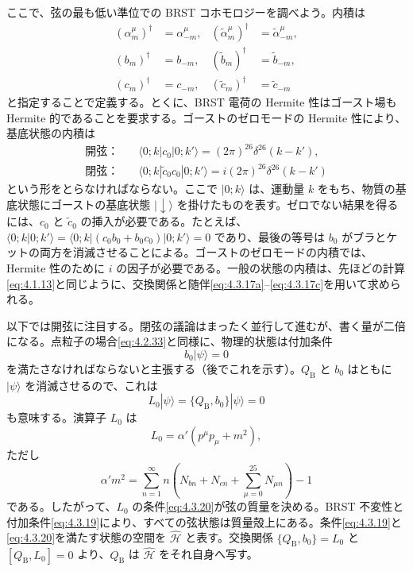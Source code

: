 
ここで、弦の最も低い準位での BRST コホモロジーを調べよう。内積は
\begin{align}
(\alpha^\mu_m)^\dagger&=\alpha^\mu_{-m},
&(\widetilde\alpha^\mu_m)^\dagger&=\widetilde\alpha^\mu_{-m},
\tag{4.3.17a}\label{eq:4.3.17a}\\
(b_m)^\dagger&=b_{-m},
&(\widetilde b_m)^\dagger&=\widetilde b_{-m},
\tag{4.3.17b}\label{eq:4.3.17b}\\
(c_m)^\dagger&=c_{-m},
&(\widetilde c_m)^\dagger&=\widetilde c_{-m}
\tag{4.3.17c}\label{eq:4.3.17c}
\end{align}
と指定することで定義する。とくに、BRST 電荷の Hermite 性はゴースト場も Hermite 的であることを要求する。ゴーストのゼロモードの Hermite 性により、基底状態の内積は
\begin{align}
\text{開弦：}\quad
&\langle0;k|c_0|0;k'\rangle=(2\pi)^{26}\delta^{26}(k-k'),
\tag{4.3.18a}\label{eq:4.3.18a}\\
\text{閉弦：}\quad
&\langle0;k|\widetilde c_0c_0|0;k'\rangle=i(2\pi)^{26}\delta^{26}(k-k')
\tag{4.3.18b}\label{eq:4.3.18b}
\end{align}
という形をとらなければならない。ここで $|0;k\rangle$ は、運動量 $k$ をもち、物質の基底状態にゴーストの基底状態 $|\downarrow\rangle$ を掛けたものを表す。ゼロでない結果を得るには、$c_0$ と $\widetilde c_0$ の挿入が必要である。たとえば、
$\langle0;k|0;k'\rangle
=\langle0;k|(c_0b_0+b_0c_0)|0;k'\rangle=0$
であり、最後の等号は $b_0$ がブラとケットの両方を消滅させることによる。ゴーストのゼロモードの内積では、Hermite 性のために $i$ の因子が必要である。一般の状態の内積は、先ほどの計算\eqref{eq:4.1.13}と同じように、交換関係と随伴\eqref{eq:4.3.17a}--\eqref{eq:4.3.17c}を用いて求められる。

以下では開弦に注目する。閉弦の議論はまったく並行して進むが、書く量が二倍になる。点粒子の場合\eqref{eq:4.2.33}と同様に、物理的状態は付加条件
\begin{equation}
b_0|\psi\rangle=0
\tag{4.3.19}\label{eq:4.3.19}
\end{equation}
を満たさなければならないと主張する（後でこれを示す）。$Q_{\mathrm B}$ と $b_0$ はともに $|\psi\rangle$ を消滅させるので、これは
\begin{equation}
L_0|\psi\rangle=\{Q_{\mathrm B},b_0\}|\psi\rangle=0
\tag{4.3.20}\label{eq:4.3.20}
\end{equation}
も意味する。演算子 $L_0$ は
\begin{equation}
L_0=\alpha'(p^\mu p_\mu+m^2),
\tag{4.3.21}\label{eq:4.3.21}
\end{equation}
ただし
\begin{equation}
\alpha'm^2=\sum_{n=1}^{\infty}n
\left(N_{bn}+N_{cn}+\sum_{\mu=0}^{25}N_{\mu n}\right)-1
\tag{4.3.22}\label{eq:4.3.22}
\end{equation}
である。したがって、$L_0$ の条件\eqref{eq:4.3.20}が弦の質量を決める。BRST 不変性と付加条件\eqref{eq:4.3.19}により、すべての弦状態は質量殻上にある。条件\eqref{eq:4.3.19}と\eqref{eq:4.3.20}を満たす状態の空間を $\widehat{\mathcal H}$ と表す。交換関係 $\{Q_{\mathrm B},b_0\}=L_0$ と $[Q_{\mathrm B},L_0]=0$ より、$Q_{\mathrm B}$ は $\widehat{\mathcal H}$ をそれ自身へ写す。

